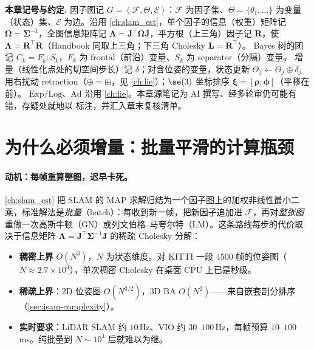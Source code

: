 \begin{note}
\textbf{本章记号与约定.}\;
因子图记 $G=(\mathcal{F},\Theta,\mathcal{E})$：$\mathcal{F}$ 为因子集、$\Theta=\{\theta_1,\dots\}$ 为变量（状态）集、$\mathcal{E}$ 为边\cite{kaess2012isam2}。沿用 \cref{ch:slam_est}，单个因子的信息（权重）矩阵记 $\boldsymbol{\Omega}=\boldsymbol{\Sigma}^{-1}$，全图信息矩阵记 $\boldsymbol{\Lambda}=\mathbf{J}^\top\boldsymbol{\Omega}\mathbf{J}$，平方根（上三角）因子记 $\mathbf{R}$，使 $\boldsymbol{\Lambda}=\mathbf{R}^\top\mathbf{R}$（Handbook\cite{carlone2026handbook} 同取上三角；下三角 Cholesky $\mathbf{L}=\mathbf{R}^\top$）。
Bayes 树的团记 $C_k=F_k:S_k$，$F_k$ 为 frontal（前沿）变量、$S_k$ 为 separator（分隔）变量。
增量（线性化点处的切空间步长）记 $\delta$；对含位姿的变量，状态更新 $\Theta_j\leftarrow\Theta_j\oplus\delta_j$ 用右扰动 retraction（$\oplus=\boxplus$，见 \cref{ch:lie}）；$\se(3)$ 坐标排序 $\boldsymbol{\xi}=[\boldsymbol{\rho};\boldsymbol{\phi}]$（平移在前）。
$\mathrm{Exp}/\mathrm{Log}$、$\mathrm{Ad}$ 沿用 \cref{ch:lie}。本章源笔记为 AI 撰写、经多轮审仍可能有错，存疑处就地以 \pz{} 标注，并汇入章末复核清单。
\end{note}

\section{为什么必须增量：批量平滑的计算瓶颈}
\label{sec:isam-why}

\paragraph{动机：每帧重算整图，迟早卡死。}
\cref{ch:slam_est} 把 SLAM 的 MAP 求解归结为一个因子图上的加权非线性最小二乘，标准解法是\emph{批量}（batch）：每收到新一帧，把新因子追加进 $\mathcal{F}$，再对\emph{整张图}重做一次高斯牛顿（GN）或列文伯格--马夸尔特（LM）。这条路线每步的代价取决于信息矩阵 $\boldsymbol{\Lambda}=\mathbf{J}^\top\boldsymbol{\Sigma}^{-1}\mathbf{J}$ 的稀疏 Cholesky 分解\cite{dellaert2006square}：
\begin{itemize}
  \item \textbf{稠密上界} $O(N^3)$，$N$ 为状态维度。对 KITTI 一段 $4500$ 帧的位姿图（$N\approx 2.7\times10^4$），单次稠密 Cholesky 在桌面 CPU 上已是秒级。
  \item \textbf{稀疏上界}：2D 位姿图 $O(N^{3/2})$，3D BA $O(N^2)$——来自嵌套剖分排序（\cref{sec:isam-complexity}）。
  \item \textbf{实时要求}：LiDAR SLAM 约 $10$\,Hz、VIO 约 $30$--$100$\,Hz，每帧预算 $10$--$100$\,ms。纯批量到 $N\sim10^4$ 后就难以为继。
\end{itemize}

